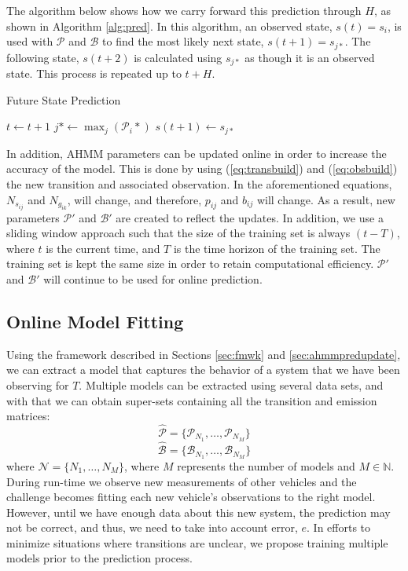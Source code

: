 \documentclass[conference]{IEEEtran}
\newcommand\NB[1]{$\spadesuit$\footnote{NB: #1}}
\begin{document}
The algorithm below shows how we carry forward this prediction through $H$, as shown in Algorithm \ref{alg:pred}. In this algorithm, an observed state, $s(t) = s_i$, is used with $\mathcal P$ and $\mathcal B$ to find the most likely next state, $s(t+1) = s_{j*}$. The following state, $s(t+2)$ is calculated using $s_{j*}$ as though it is an observed state. This process is repeated up to $t+H$. 

\begin{algorithm}[ht!]
\caption{Future State Prediction} \label{alg:pred}
\begin{algorithmic}[1]
\STATE $t \gets t+1$
\STATE $j* \gets \max_j(\mathcal{P}_{i}*)$
\ENDFOR
\STATE $s(t+1) \gets s_{j*}$
\ENDWHILE
\end{algorithmic}
\end{algorithm}

In addition, AHMM parameters can be updated online in order to increase the accuracy of the model. This is done by using (\ref{eq:transbuild}) and (\ref{eq:obsbuild}) the new transition and associated observation. In the aforementioned equations, $N_{s_{ij}}$ and $N_{g_{ik}}$, will change, and therefore, $p_{ij}$ and $b_{ij}$ will change. As a result, new parameters $\mathcal{P'}$ and $\mathcal{B'}$ are created to reflect the updates. In addition, we use a sliding window approach such that the size of the training set is always $(t-T)$, where $t$ is the current time, and $T$ is the time horizon of the training set. The training set is kept the same size in order to retain computational efficiency. $\mathcal{P'}$ and $\mathcal{B'}$ will continue to be used for online prediction. %

\subsection{Online Model Fitting}\label{sec:omf} %
Using the framework described in Sections \ref{sec:fmwk} and \ref{sec:ahmmpredupdate},  we can extract a model that captures the behavior of a system that we have been observing for $T$. Multiple models can be extracted using several data sets, and with that we can obtain super-sets containing all the transition and emission matrices: 
\begin{equation}
    \hat{\mathcal{P}} = \{\mathcal{P}_{N_{1}},\ldots,\mathcal{P}_{N_{M}}\}
\end{equation}
\begin{equation}
    \hat{\mathcal{B}} = \{\mathcal{B}_{N_{1}},\ldots,\mathcal{B}_{N_{M}}\}
\end{equation}
where $\mathcal{N} = \{N_1,\ldots,N_M\}$, where $M$ represents the number of models and $M\in\mathbb{N}$.
During run-time we observe new measurements of other vehicles and the challenge becomes fitting each new vehicle's observations to the right model. However, until we have enough data about this new system, the prediction may not be correct, and thus, we need to take into account error, $e$. In efforts to minimize situations where transitions are unclear, we propose training multiple models prior to the prediction process.
\end{document}
